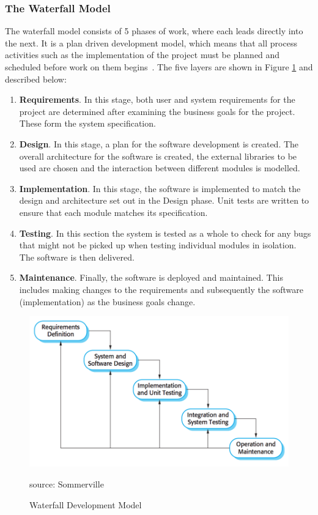 \documentclass{article}
\begin{document}
\subsubsection{The Waterfall Model}
The waterfall model consists of 5 phases of work, where each leads directly into the next.  It is a plan driven development model, which means that all process activities such as the implementation of the project must be planned and scheduled before work on them begins~\cite{sommervilleSoftwareEngineering}.  The five layers are shown in Figure \ref{fig:waterfallModel} and described below:
\begin{enumerate}
  \item {\bf Requirements}.  In this stage, both user and system requirements for the project are determined after examining the business goals for the project.  These form the system specification.
  \item {\bf Design}.  In this stage, a plan for the software development is created.  The overall architecture for the software is created, the external libraries to be used are chosen and the interaction between different modules is modelled.
  \item {\bf Implementation}.  In this stage, the software is implemented to match the design and architecture set out in the Design phase.  Unit tests are written to ensure that each module matches its specification.
  \item {\bf Testing}.  In this section the system is tested as a whole to check for any bugs that might not be picked up when testing individual modules in isolation.  The software is then delivered.
  \item {\bf Maintenance}.  Finally, the software is deployed and maintained.  This includes making changes to the requirements and subsequently the software (implementation) as the business goals change. ~\cite{sommervilleSoftwareEngineering}
\end{enumerate}

\begin{figure}[htb] 
\centering
    \includegraphics[width=0.8\linewidth]{waterfallModel}
\caption{Waterfall Development Model}
\small source: Sommerville~\cite{sommervilleSoftwareEngineering}
\label{fig:waterfallModel}
\end{figure}
\end{document}
